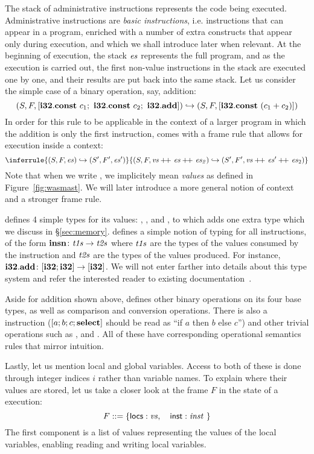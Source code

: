 \documentclass[acmsmall,screen]{acmart}\settopmatter{}
\begin{document}
The stack of administrative instructions represents the \wasm code being executed. Administrative instructions are \emph{basic instructions}, i.e. instructions that can appear in a \wasm program, enriched with a number of extra constructs that appear only during execution, and which we shall introduce later when relevant. At the beginning of execution, the stack \( \mathit{es} \) represents the full \wasm program, and as the execution is carried out, the first non-value instructions in the stack are executed one by one, and their results are put back into the same stack. Let us consider the simple case of a binary operation, say, \xxWithirtytwo addition:
\[ (S,F, [\mathbf{i32}.\mathbf{const}~c_1;~\mathbf{i32}.\mathbf{const}~c_2;~\mathbf{i32}.\mathbf{add}]) \hookrightarrow (S,F, [\mathbf{i32}.\mathbf{const}~(c_1 + c_2)]) \]
In order for this rule to be applicable in the context of a larger program in which the addition is only the first instruction, \wasm comes with a frame rule that allows for execution inside a context:
\[ \inferrule{(S,F,\V{es})\hookrightarrow(S',F',\V{es}')}{(S,F, \V{vs}\cat\V{es}\cat\V{es_2})\hookrightarrow(S',F',\V{vs}\cat\V{es}'\cat\V{es}_2)} \]
Note that when we write , we implicitely mean \emph{values} as defined in Figure~\ref{fig:wasmast}. We will later introduce a more general notion of context and a stronger frame rule.

\wasm defines 4 simple types for its values: \xxWithirtytwo, \xxWisixtyfour, \xxWfthirtytwo and \xxWfsixtyfour, to which \mswasm adds one extra type \xxWhandle which we discuss in \S\ref{sec:memory}. \wasm defines a simple notion of typing for all instructions, of the form \( \mathsf{\mathbf{insn}}\colon\mathit{t1s}\to\mathit{t2s} \) where \( \mathit{t1s} \) are the types of the values consumed by the instruction and \( \mathit{t2s} \) are the types of the values produced. For instance, \( \mathbf{i32}.\mathbf{add}\colon[\mathbf{i32};\mathbf{i32}]\to[\mathbf{i32}] \). We will not enter farther into details about this type system and refer the interested reader to existing documentation~\cite{wasm}.

Aside for addition shown above, \wasm defines other binary operations on its four base types, as well as comparison and conversion operations. There is also a \xxWselect instruction (\( [a;b;c;\mathbf{select}] \) should be read as ``if \( a \) then \( b \) else \( c \)'') and other trivial operations such as \xxWdrop, \xxWnop and \xxWunreachable. All of these have corresponding operational semantics rules that mirror intuition.

Lastly, let us mention local and global variables. Access to both of these is done through integer indices \( i \) rather than variable names. To explain where their values are stored, let us take a closer look at the frame \( F \) in the state of a \wasm execution:
\[  F::=\{ \mathsf{locs} : \mathit{vs}, \quad \mathsf{inst} : \mathit{inst} ~ \} \]
The first component  is a list of values representing the values of the local variables, enabling reading and writing local variables.
\end{document}
